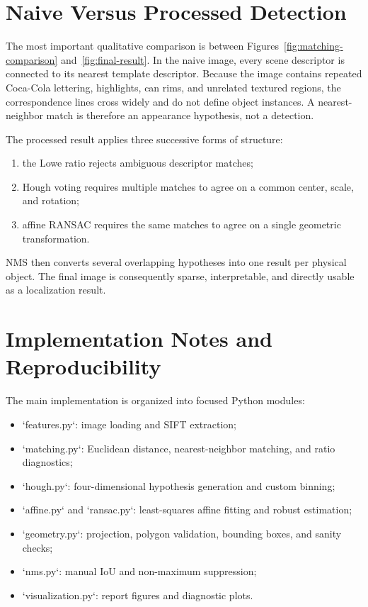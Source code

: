 \documentclass[10pt,twocolumn]{article}
\begin{document}
\section{Naive Versus Processed Detection}
The most important qualitative comparison is between Figures~\ref{fig:matching-comparison} and~\ref{fig:final-result}. In the naive image, every scene descriptor is connected to its nearest template descriptor. Because the image contains repeated Coca-Cola lettering, highlights, can rims, and unrelated textured regions, the correspondence lines cross widely and do not define object instances. A nearest-neighbor match is therefore an appearance hypothesis, not a detection.

The processed result applies three successive forms of structure:
\begin{enumerate}
  \item the Lowe ratio rejects ambiguous descriptor matches;
  \item Hough voting requires multiple matches to agree on a common center, scale, and rotation;
  \item affine RANSAC requires the same matches to agree on a single geometric transformation.
\end{enumerate}
NMS then converts several overlapping hypotheses into one result per physical object. The final image is consequently sparse, interpretable, and directly usable as a localization result.

\section{Implementation Notes and Reproducibility}
The main implementation is organized into focused Python modules:
\begin{itemize}
  \item `features.py`: image loading and SIFT extraction;
  \item `matching.py`: Euclidean distance, nearest-neighbor matching, and ratio diagnostics;
  \item `hough.py`: four-dimensional hypothesis generation and custom binning;
  \item `affine.py` and `ransac.py`: least-squares affine fitting and robust estimation;
  \item `geometry.py`: projection, polygon validation, bounding boxes, and sanity checks;
  \item `nms.py`: manual IoU and non-maximum suppression;
  \item `visualization.py`: report figures and diagnostic plots.
\end{itemize}
\end{document}
